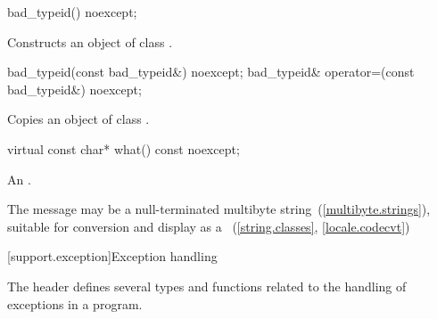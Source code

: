 %
\begin{itemdecl}
bad_typeid() noexcept;
\end{itemdecl}

\begin{itemdescr}
\pnum
\effects
Constructs an object of class
.
\end{itemdescr}

%
%
\begin{itemdecl}
bad_typeid(const bad_typeid&) noexcept;
bad_typeid& operator=(const bad_typeid&) noexcept;
\end{itemdecl}

\begin{itemdescr}
\pnum
\effects
Copies an object of class
.
\end{itemdescr}

%
\begin{itemdecl}
virtual const char* what() const noexcept;
\end{itemdecl}

\begin{itemdescr}
\pnum
\returns
An  \ntbs.%

\pnum
\notes
The message may be a null-terminated multibyte string~(\ref{multibyte.strings}),
suitable for conversion and display as a
~(\ref{string.classes}, \ref{locale.codecvt})
\end{itemdescr}

[support.exception]{Exception handling}

\pnum
The header
defines several types and functions related to the handling of exceptions in a \Cpp program.


